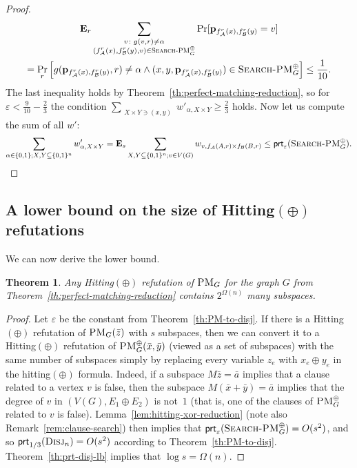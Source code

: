 \documentclass[11pt]{article}
\newcommand{\scterm}[1]{{\textrm{\sc #1}}}
\newcommand{\hit}{\scterm{Hitting}}
\newcommand{\hitp}{{\hit}$(\oplus)$}
\newcommand{\prt}{\mathsf{prt}}
\newcommand{\disj}{\scterm{Disj}}
\newcommand{\PM}{\scterm{PM}}
\newcommand{\forxorPM}{\textsc{PM}^\oplus}
\newcommand{\xorPM}{\textsc{Search-PM}^\oplus}
\newcommand{\Alice}{\mathcal{A}}
\newcommand{\Bob}{\mathcal{B}}
\newcommand{\E}{\mathbf{E}}
\numberwithin{equation}{section}
\newtheorem{theorem}{Theorem}[section]
\begin{document}
\begin{proof}
\begin{multline*}    
\E_r \sum_{\substack{v\colon g(v, r) \neq \alpha \\ (f_{\Alice}^r(x), f_{\Bob}^r(y),v) \in \xorPM_G}} \Pr[\mathbf{p}_{f_{\Alice}^r(x), f_{\Bob}^r(y)}=v] \\=\Pr_r\left[g(\mathbf{p}_{f_{\Alice}^r(x), f_{\Bob}^r(y)}, r) \neq \alpha \land (x,y,\mathbf{p}_{f_{\Alice}^r(x), f_{\Bob}^r(y)}) \in \xorPM_G\right] 
    \le\frac{1}{10}.
\end{multline*}
The last inequality holds by Theorem~\ref{th:perfect-matching-reduction}, so for $\varepsilon < \frac{9}{10} - \frac{2}{3}$ the condition $\sum\limits_{\substack{ X \times Y \ni (x, y)}} w'_{\alpha, X \times Y} \ge \frac23 $ holds. Now let us compute the sum of all $w'$:
\[ \sum_{\alpha \in \{0,1\}; X, Y \subseteq \{0,1\}^{n}} w'_{\alpha, X \times Y} = \E_s  \sum_{X, Y \subseteq \{0,1\}^n; v \in V(G)} w_{v, f_{\Alice}(A,r) \times f_{\Bob}(B,r)}   \le \prt_\varepsilon (\xorPM_G). \qedhere\]

\end{proof}

\subsection{A lower bound on the size of \texorpdfstring{{\hitp}}{Hitting(xor)} refutations}
We can now derive the lower bound. 


\begin{theorem}\label{th:hitting-plus-lb-pm}
Any {\hitp} refutation of $\PM_G$ for the graph $G$ from Theorem~\ref{th:perfect-matching-reduction} contains $2^{\Omega(n)}$ many subspaces.
\end{theorem}

\begin{proof}
Let $\varepsilon$ be the constant from Theorem~\ref{th:PM-to-disj}. If there is a {\hitp}
refutation of $\PM_G(\bar{z})$ with $s$ subspaces, then we can convert it to 
a {\hitp} refutation of $\forxorPM_G(\bar{x},\bar{y})$ (viewed
as a set of subspaces) with the same number of subspaces
simply by replacing every variable $z_e$ with $x_e\oplus y_e$
in the hitting$(\oplus)$ formula.
Indeed, if a subspace $M\bar{z}=\bar{a}$ implies that 
a clause related to a vertex $v$ is false, 
then the subspace $M(\bar{x}+\bar{y})=\bar{a}$ 
implies that the degree of $v$ in $(V(G),E_1 \oplus E_2)$ is not~$1$
(that is, one of the clauses of $\forxorPM_G$ related to $v$ is false).
Lemma~\ref{lem:hitting-xor-reduction} (note also Remark~\ref{rem:clause-search})
then implies that 
$\prt_\varepsilon(\xorPM_G) = O(s^2)$, and so 
$\prt_{1/3}(\disj_n) = O(s^2)$ according to Theorem~\ref{th:PM-to-disj}. 
Theorem~\ref{th:prt-disj-lb} implies that $\log s = \Omega(n)$.
\end{proof}
\end{document}
